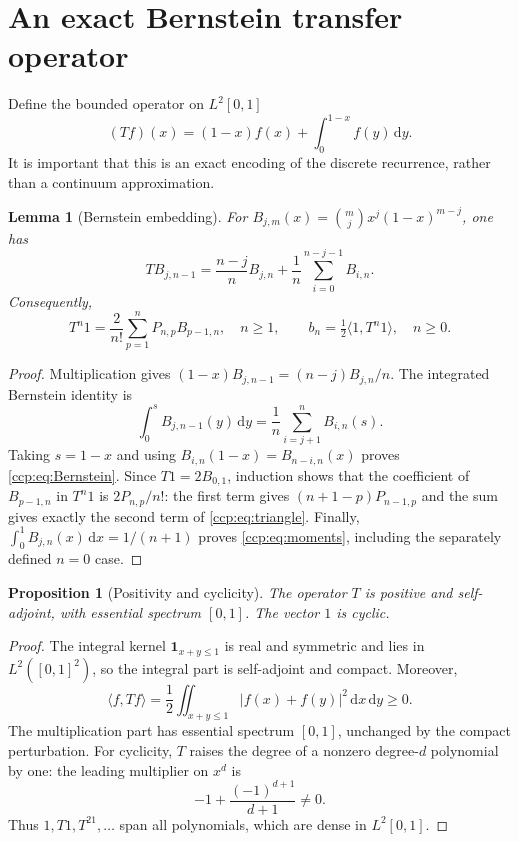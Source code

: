 \documentclass[11pt,letterpaper]{article}
\newtheorem{proposition}[theorem]{Proposition}
\newtheorem{lemma}[theorem]{Lemma}
\theoremstyle{remark}\newtheorem{remark}[theorem]{Remark}
\newcommand{\dd}{\,\mathrm d}
\begin{document}
\section{An exact Bernstein transfer operator}
Define the bounded operator on $L^2[0,1]$
\begin{equation}
(Tf)(x)=(1-x)f(x)+\int_0^{1-x}f(y)\dd y.\label{ccp:eq:T}
\end{equation}
It is important that this is an exact encoding of the discrete recurrence, rather than a continuum approximation.

\begin{lemma}[Bernstein embedding]\label{ccp:lem:bernstein}
For $B_{j,m}(x)=\binom mjx^j(1-x)^{m-j}$, one has
\begin{equation}
TB_{j,n-1}=\frac{n-j}{n}B_{j,n}
       +\frac1n\sum_{i=0}^{n-j-1}B_{i,n}.\label{ccp:eq:Bernstein}
\end{equation}
Consequently,
\begin{equation}
T^n1=\frac2{n!}\sum_{p=1}^nP_{n,p}B_{p-1,n},\quad n\ge1,
\qquad b_n=\tfrac12\langle1,T^n1\rangle,\quad n\ge0.\label{ccp:eq:moments}
\end{equation}
\end{lemma}
\begin{proof}
Multiplication gives $(1-x)B_{j,n-1}=(n-j)B_{j,n}/n$. The integrated Bernstein identity is
\[
\int_0^sB_{j,n-1}(y)\dd y=\frac1n\sum_{i=j+1}^nB_{i,n}(s).
\]
Taking $s=1-x$ and using $B_{i,n}(1-x)=B_{n-i,n}(x)$ proves \eqref{ccp:eq:Bernstein}. Since $T1=2B_{0,1}$, induction shows that the coefficient of $B_{p-1,n}$ in $T^n1$ is $2P_{n,p}/n!$: the first term gives $(n+1-p)P_{n-1,p}$ and the sum gives exactly the second term of \eqref{ccp:eq:triangle}. Finally, $\int_0^1B_{j,n}(x)\dd x=1/(n+1)$ proves \eqref{ccp:eq:moments}, including the separately defined $n=0$ case.
\end{proof}

\begin{proposition}[Positivity and cyclicity]\label{ccp:prop:positive}
The operator $T$ is positive and self-adjoint, with essential spectrum $[0,1]$. The vector $1$ is cyclic.
\end{proposition}
\begin{proof}
The integral kernel $\mathbf1_{x+y\le1}$ is real and symmetric and lies in $L^2([0,1]^2)$, so the integral part is self-adjoint and compact. Moreover,
\begin{equation}
\langle f,Tf\rangle=\frac12\iint_{x+y\le1}|f(x)+f(y)|^2\dd x\dd y\ge0.\label{ccp:eq:positive}
\end{equation}
The multiplication part has essential spectrum $[0,1]$, unchanged by the compact perturbation. For cyclicity, $T$ raises the degree of a nonzero degree-$d$ polynomial by one: the leading multiplier on $x^d$ is
\[
-1+\frac{(-1)^{d+1}}{d+1}\ne0.
\]
Thus $1,T1,T^21,\ldots$ span all polynomials, which are dense in $L^2[0,1]$.
\end{proof}
\end{document}
